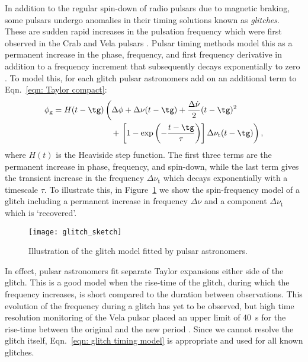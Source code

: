 In addition to the regular spin-down of radio pulsars due to magnetic braking,
some pulsars undergo anomalies in their timing solutions known as
\emph{glitches}.  These are sudden rapid increases in the pulsation frequency
which were first observed in the Crab \citep{Boynton1969, Richards1969} and
Vela pulsars \citep{RadhakrishnanManchester1969, Reichley1969}. Pulsar
timing methods model this as a permanent increase in the phase, frequency, and
first frequency derivative in addition to a frequency increment that
subsequently decays exponentially to zero \citep{Edwards2006}.  To model this,
for each glitch pulsar astronomers add on an additional term to
Eqn.~\eqref{eqn: Taylor compact}:
\begin{align}
\begin{split}
\phi_{\textrm{g}} = H(t - \tg)& {}\left(
\Delta\phi + \Delta\nu(t - \tg) + \frac{\Delta\dot{\nu}}{2}(t - \tg)^{2} \right.\\
& \hspace{3mm}+ \left.\left[1-\exp\left(-\frac{t - \tg}{\tau}\right)\right]
\Delta\nu_{\textrm{t}}(t - \tg)
\right),
\end{split}
\label{eqn: glitch timing model}
\end{align}
where $H(t)$ is the Heaviside step function. The first
three terms are the permanent increase in phase, frequency, and spin-down,
while the last term gives the transient increase in the frequency
$\Delta\nu_{\textrm{t}}$ which decays exponentially with a timescale $\tau$.
To illustrate this, in Figure~\ref{fig: glitch sketch} we show the spin-frequency
model of a glitch including a permanent increase in frequency $\Delta\nu$ and
a component $\Delta\nu_{\textrm{t}}$ which is `recovered'.
\begin{figure}[htb]
\centering
\texttt{[image: glitch\_sketch]}
\caption{Illustration of the glitch model fitted by pulsar astronomers.}
\label{fig: glitch sketch}
\end{figure}

In effect, pulsar astronomers fit separate Taylor expansions either side of the
glitch. This is a good model when the rise-time of the glitch, during which the
frequency increases, is short compared to the duration between observations.
This evolution of the frequency during a glitch has yet to be observed, but
high time resolution monitoring of the Vela pulsar placed an upper limit of
40~s for the rise-time between the original and the new period
\citep{Dodson2001}. Since we cannot resolve the glitch itself,
Eqn.~\eqref{eqn: glitch timing model} is appropriate and used for all known
glitches.

